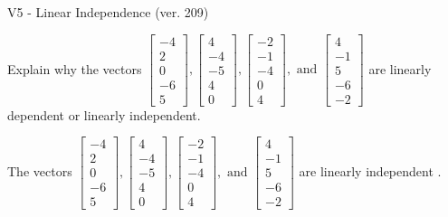 \begin{exercise}
  \begin{exerciseTitle}V5 - Linear Independence (ver. 209)\end{exerciseTitle}
  \begin{exerciseStatement}
    Explain why the vectors \(\left[\begin{array}{r}
-4 \\
2 \\
0 \\
-6 \\
5
\end{array}\right] , \left[\begin{array}{r}
4 \\
-4 \\
-5 \\
4 \\
0
\end{array}\right] , \left[\begin{array}{r}
-2 \\
-1 \\
-4 \\
0 \\
4
\end{array}\right] , \text{ and } \left[\begin{array}{r}
4 \\
-1 \\
5 \\
-6 \\
-2
\end{array}\right]\) are linearly dependent or linearly independent.	


  \end{exerciseStatement}
  \begin{exerciseAnswer}
   The vectors \(\left[\begin{array}{r}
-4 \\
2 \\
0 \\
-6 \\
5
\end{array}\right] , \left[\begin{array}{r}
4 \\
-4 \\
-5 \\
4 \\
0
\end{array}\right] , \left[\begin{array}{r}
-2 \\
-1 \\
-4 \\
0 \\
4
\end{array}\right] , \text{ and } \left[\begin{array}{r}
4 \\
-1 \\
5 \\
-6 \\
-2
\end{array}\right]\) are 
  	 linearly independent  .
  


  \end{exerciseAnswer}
\end{exercise}